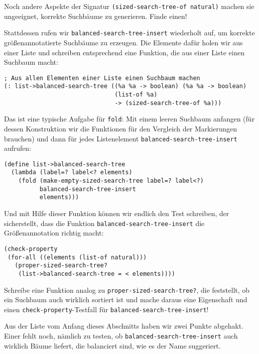 \begin{aufgabeinline}
  Noch andere Aspekte der Signatur
  \lstinline{(sized-search-tree-of natural)}
  machen sie ungeeignet, korrekte Suchbäume zu generieren.  Finde
  einen!
\end{aufgabeinline}
%
Stattdessen rufen wir \lstinline{balanced-search-tree-insert} wiederholt auf,
um korrekte größenannotatierte Suchbäume zu erzeugen.
Die Elemente dafür holen wir aus einer Liste und schreiben
entsprechend eine Funktion, die aus einer Liste einen Suchbaum macht:
%
\begin{lstlisting}
; Aus allen Elementen einer Liste einen Suchbaum machen
(: list->balanced-search-tree ((%a %a -> boolean) (%a %a -> boolean) 
                               (list-of %a)
                               -> (sized-search-tree-of %a)))
\end{lstlisting}
%
Das ist eine typische Aufgabe für \lstinline{fold}: Mit einem leeren
Suchbaum anfangen (für dessen Konstruktion wir die Funktionen für den
Vergleich der Markierungen brauchen) und dann für jedes Listenelement
\lstinline{balanced-search-tree-insert} aufrufen:
%
\begin{lstlisting}
(define list->balanced-search-tree
  (lambda (label=? label<? elements)
    (fold (make-empty-sized-search-tree label=? label<?)
          balanced-search-tree-insert
          elements)))
\end{lstlisting}
%
Und mit Hilfe dieser Funktion können wir endlich den Test schreiben,
der sicherstellt, dass die Funktion \lstinline{balanced-search-tree-insert} die
Größenannotation richtig macht:
%
\begin{lstlisting}
(check-property
 (for-all ((elements (list-of natural)))
   (proper-sized-search-tree?
    (list->balanced-search-tree = < elements))))
\end{lstlisting}
%
\begin{aufgabeinline}
  Schreibe eine Funktion analog zu
  \lstinline{proper-sized-search-tree?}, die feststellt, ob ein
  Suchbaum auch wirklich sortiert ist und mache daraus eine
  Eigenschaft und einen \lstinline{check-property}-Testfall für
  \lstinline{balanced-search-tree-insert}!
\end{aufgabeinline}
%
Aus der Liste vom Anfang dieses Abschnitts haben wir zwei Punkte
abgehakt. Einer fehlt noch, nämlich zu testen, ob
\lstinline{balanced-search-tree-insert} auch wirklich Bäume liefert,
die balanciert
sind, wie es der Name suggeriert.

